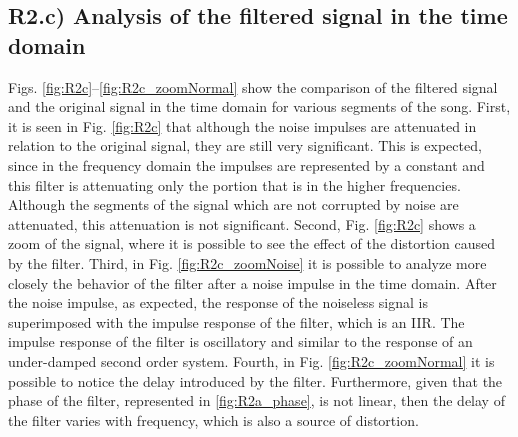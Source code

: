 \documentclass[a4paper, oneside, 11pt]{article}
\begin{document}
\subsection{R2.c) Analysis of the filtered signal in the time domain}

Figs. \ref{fig:R2c}--\ref{fig:R2c_zoomNormal} show the comparison of the filtered signal and the original signal in the time domain for various segments of the song. First, it is seen in Fig. \ref{fig:R2c} that although the noise impulses are attenuated in relation to the original signal, they are still very significant. This is expected, since in the frequency domain the impulses are represented by a constant and this filter is attenuating only the portion that is in the higher frequencies. Although the segments of the signal which are not corrupted by noise are attenuated, this attenuation is not significant. Second, Fig. \ref{fig:R2c} shows a zoom of the signal, where it is possible to see the effect of the distortion caused by the filter. Third, in Fig. \ref{fig:R2c_zoomNoise} it is possible to analyze more closely the behavior of the filter after a noise impulse in the time domain. After the noise impulse, as expected, the response of the noiseless signal is superimposed with the impulse response of the filter, which is an IIR. The impulse response of the filter is oscillatory and similar to the response of an under-damped second order system. Fourth, in Fig. \ref{fig:R2c_zoomNormal} it is possible to notice the delay introduced by the filter. Furthermore, given that the phase of the filter, represented in \ref{fig:R2a_phase}, is not linear, then the delay of the filter varies with frequency, which is also a source of distortion.
\end{document}
